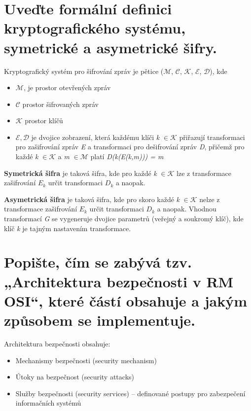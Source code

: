 \clearpage
\section{Uveďte formální definici kryptografického systému, symetrické a asymetrické šifry.}

Kryptografický systém pro šifrování zpráv je pětice ($\mathcal{M}$, $\mathcal{C}$, $\mathcal{K}$, $\mathcal{E}$, $\mathcal{D}$), kde
\begin{itemize}
    \item $\mathcal{M}$, je prostor otevřených zpráv
    \item $\mathcal{C}$ prostor šifrovaných zpráv
    \item $\mathcal{K}$ prostor klíčů
    \item $\mathcal{E,D}$ je dvojice zobrazení, která každému klíči \textit{k} $\in \mathcal{K}$ přiřazují transformaci pro zašifrování zpráv \textit{E} a transformaci pro dešifrování zpráv \textit{D}, přičemž pro každé \textit{k} $\in \mathcal{K}$ a \textit{m} $\in \mathcal{M}$ platí \textit{D(k(E(k,m))) = \textit{m}}
\end{itemize}

\textbf{Symetrická šifra} je taková šifra, kde pro každé \textit{k} $\in \mathcal{K}$ lze z transformace zašifrování $E_k$ určit transformaci $D_k$ a naopak.

\textbf{Asymetrická šifra} je taková šifra, kde pro skoro každé \textit{k} $\in \mathcal{K}$ nelze z transformace zašifrování $E_k$ určit transformaci $D_k$ a naopak.
Vhodnou transformací \textit{G} se vygeneruje dvojice parametrů (veřejný a soukromý klíč), kde klíč \textit{k} je tajným nastavením transformace.

\section{Popište, čím se zabývá tzv. „Architektura bezpečnosti v RM OSI“, které částí obsahuje a jakým způsobem se implementuje.}

Architektura bezpečnosti obsahuje:
\begin{itemize}
    \item Mechanismy bezpečnosti (security mechanism)
    \item Útoky na bezpečnost (security attacks)
    \item Služby bezpečnosti (security services) -- definované postupy pro zabezpečení informačních systémů
\end{itemize}

